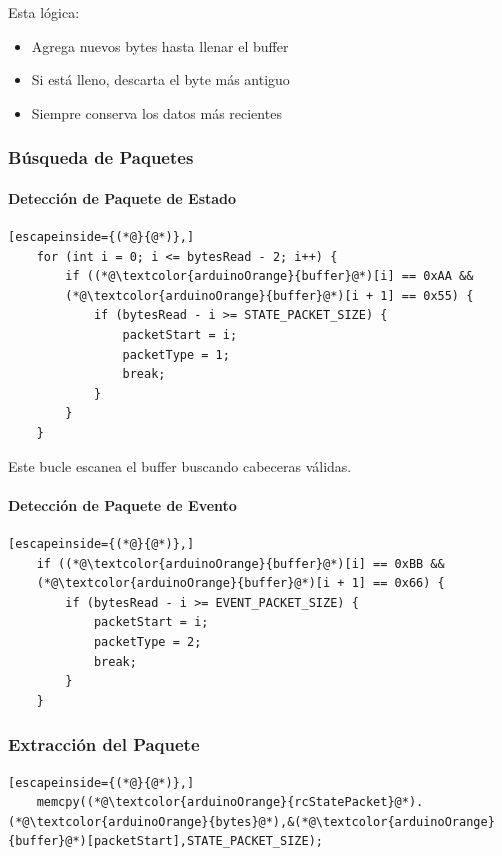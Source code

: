 \documentclass[12pt,a4paper]{article}
\begin{document}
Esta lógica:

\begin{itemize}
	\item Agrega nuevos bytes hasta llenar el buffer
	\item Si está lleno, descarta el byte más antiguo
	\item Siempre conserva los datos más recientes
\end{itemize}

\subsubsection{Búsqueda de Paquetes}

\paragraph{Detección de Paquete de Estado}\mbox{}

\begin{lstlisting}[escapeinside={(*@}{@*)},]
	for (int i = 0; i <= bytesRead - 2; i++) {
		if ((*@\textcolor{arduinoOrange}{buffer}@*)[i] == 0xAA &&
		(*@\textcolor{arduinoOrange}{buffer}@*)[i + 1] == 0x55) {
			if (bytesRead - i >= STATE_PACKET_SIZE) {
				packetStart = i;
				packetType = 1;
				break;
			}
		}
	}
\end{lstlisting}

Este bucle escanea el buffer buscando cabeceras válidas.

\paragraph{Detección de Paquete de Evento}\mbox{}

\begin{lstlisting}[escapeinside={(*@}{@*)},]
	if ((*@\textcolor{arduinoOrange}{buffer}@*)[i] == 0xBB &&
	(*@\textcolor{arduinoOrange}{buffer}@*)[i + 1] == 0x66) {
		if (bytesRead - i >= EVENT_PACKET_SIZE) {
			packetStart = i;
			packetType = 2;
			break;
		}
	}
\end{lstlisting}

\subsubsection{Extracción del Paquete}

\begin{lstlisting}[escapeinside={(*@}{@*)},]
	memcpy((*@\textcolor{arduinoOrange}{rcStatePacket}@*).(*@\textcolor{arduinoOrange}{bytes}@*),&(*@\textcolor{arduinoOrange}{buffer}@*)[packetStart],STATE_PACKET_SIZE);
\end{lstlisting}
\end{document}
